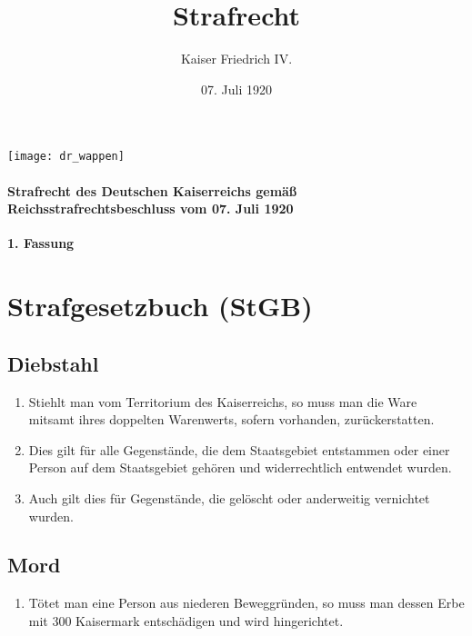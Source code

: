 \documentclass{article}
\title{Strafrecht}
\author{Kaiser Friedrich IV.}
\date{07. Juli 1920}
\begin{document}
\maketitle
\begin{center}
    \texttt{[image: dr\_wappen]}
\end{center}
\vspace*{\fill}
\paragraph{Strafrecht des Deutschen Kaiserreichs gemäß Reichsstrafrechtsbeschluss vom 07. Juli 1920}

\newpage
{}
\vspace*{\fill}
\begin{Center}
\textbf{1. Fassung}
\vspace*{\fill}
\end{Center}
\newpage
\tableofcontents
\newpage

\section{Strafgesetzbuch (StGB)}
\localtableofcontents
\subsection{Diebstahl}
\begin{enumerate}[(1)]
    \item Stiehlt man vom Territorium des Kaiserreichs, so muss man die Ware mitsamt ihres doppelten Warenwerts, sofern vorhanden, zurückerstatten.
    \item Dies gilt für alle Gegenstände, die dem Staatsgebiet entstammen oder einer Person auf dem Staatsgebiet gehören und widerrechtlich entwendet wurden.
    \item Auch gilt dies für Gegenstände, die gelöscht oder anderweitig vernichtet wurden.
\end{enumerate}

\subsection{Mord}
\begin{enumerate}[(1)]
    \item Tötet man eine Person aus niederen Beweggründen, so muss man dessen Erbe mit 300 Kaisermark entschädigen und wird hingerichtet.
\end{enumerate}
\end{document}
